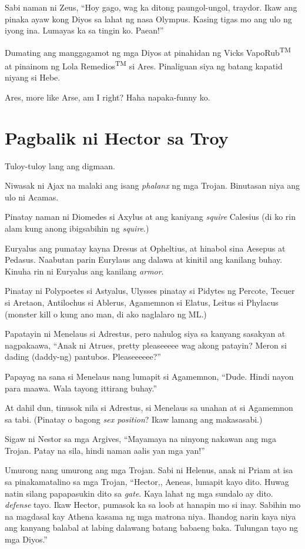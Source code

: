 \documentclass[12pt,letterpaper]{report}
\begin{document}
Sabi naman ni Zeus, ``Hoy gago, wag ka ditong paungol-ungol, traydor. Ikaw ang pinaka ayaw kong Diyos sa lahat ng nasa Olympus. Kasing tigas mo ang ulo ng iyong ina. Lumayas ka sa tingin ko. Paean!''

Dumating ang manggagamot ng mga Diyos at pinahidan ng Vicks VapoRub\textsuperscript{TM} at pinainom ng Lola Remedios\textsuperscript{TM} si Ares. Pinaliguan siya ng batang kapatid niyang si Hebe.

Ares, more like Arse, am I right? Haha napaka-funny ko. \pagebreak
\chapter{Pagbalik ni Hector sa Troy}

Tuloy-tuloy lang ang digmaan.

Niwasak ni Ajax na malaki ang isang \textit{phalanx} ng mga Trojan. Binutasan niya ang ulo ni Acamas.

Pinatay naman ni Diomedes si Axylus at ang kaniyang \textit{squire} Calesius (di ko rin alam kung anong ibigsabihin ng \textit{squire}.)

Euryalus ang pumatay kayna Dresus at Opheltius, at hinabol sina Aesepus at Pedasus. Naabutan parin Eurylaus ang dalawa at kinitil ang kanilang buhay. Kinuha rin ni Euryalus ang kanilang \textit{armor}.

Pinatay ni Polypoetes si Astyalus, Ulysses pinatay si Pidytes ng Percote, Tecuer si Aretaon, Antilochus si Ablerus, Agamemnon si Elatus, Leitus si Phylacus (monster kill o kung ano man, di ako naglalaro ng ML.)

Papatayin ni Menelaus si Adrestus, pero nahulog siya sa kanyang sasakyan at nagpakaawa, ``Anak ni Atrues, pretty pleaseeeee wag akong patayin? Meron si dading (daddy-ng) pantubos. Pleaseeeeee?''

Papayag na sana si Menelaus nang lumapit si Agamemnon, ``Dude. Hindi nayon para maawa. Wala tayong ittirang buhay.''

At dahil dun, tinusok nila si Adrestus, si Menelaus sa unahan at si Agamemnon sa tabi. (Pinatay o bagong \textit{sex position}? Ikaw lamang ang makasasabi.)

Sigaw ni Nestor sa mga Argives, ``Mayamaya na ninyong nakawan ang mga Trojan. Patay na sila, hindi naman aalis yan mga yan!''

Umurong nang umurong ang mga Trojan. Sabi ni Helenus, anak ni Priam at isa sa pinakamatalino sa mga Trojan, ``Hector,, Aeneas, lumapit kayo dito. Huwag natin silang papapasukin dito sa \textit{gate}. Kaya lahat ng mga sundalo ay dito. \textit{defense} tayo. Ikaw Hector, pumasok ka sa loob at hanapin mo si inay. Sabihin mo na magdasal kay Athena kasama ng mga matrona niya. Ihandog narin kaya niya ang kanyang balabal at labing dalawang batang babaeng baka. Tulungan tayo ng mga Diyos.''
\end{document}
